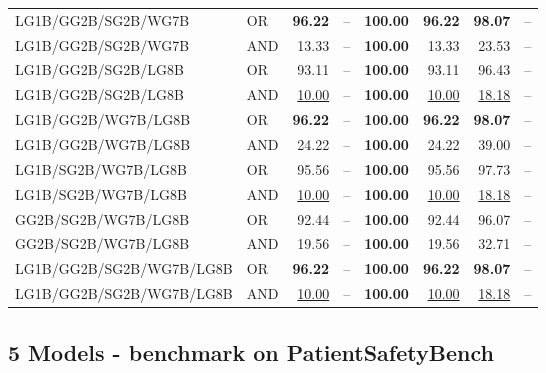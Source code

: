 \documentclass{article}
\begin{document}
{\begin{longtable}{llrrrrrr}
 LG1B/GG2B/SG2B/WG7B      & OR      & \textbf{96.22}    & --            & \textbf{100.00} & \textbf{96.22}    & \textbf{98.07}    & --    \\
 LG1B/GG2B/SG2B/WG7B      & AND     & 13.33             & --            & \textbf{100.00} & 13.33             & 23.53             & --    \\
 LG1B/GG2B/SG2B/LG8B      & OR      & 93.11             & --            & \textbf{100.00} & 93.11             & 96.43             & --    \\
 LG1B/GG2B/SG2B/LG8B      & AND     & \underline{10.00} & --            & \textbf{100.00} & \underline{10.00} & \underline{18.18} & --    \\
 LG1B/GG2B/WG7B/LG8B      & OR      & \textbf{96.22}    & --            & \textbf{100.00} & \textbf{96.22}    & \textbf{98.07}    & --    \\
 LG1B/GG2B/WG7B/LG8B      & AND     & 24.22             & --            & \textbf{100.00} & 24.22             & 39.00             & --    \\
 LG1B/SG2B/WG7B/LG8B      & OR      & 95.56             & --            & \textbf{100.00} & 95.56             & 97.73             & --    \\
 LG1B/SG2B/WG7B/LG8B      & AND     & \underline{10.00} & --            & \textbf{100.00} & \underline{10.00} & \underline{18.18} & --    \\
 GG2B/SG2B/WG7B/LG8B      & OR      & 92.44             & --            & \textbf{100.00} & 92.44             & 96.07             & --    \\
 GG2B/SG2B/WG7B/LG8B      & AND     & 19.56             & --            & \textbf{100.00} & 19.56             & 32.71             & --    \\
 LG1B/GG2B/SG2B/WG7B/LG8B & OR      & \textbf{96.22}    & --            & \textbf{100.00} & \textbf{96.22}    & \textbf{98.07}    & --    \\
 LG1B/GG2B/SG2B/WG7B/LG8B & AND     & \underline{10.00} & --            & \textbf{100.00} & \underline{10.00} & \underline{18.18} & --    \\

\end{longtable}
}


\subsection{5 Models - benchmark on PatientSafetyBench}
\end{document}
